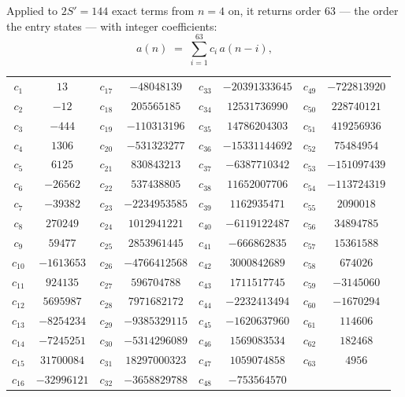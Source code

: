 \documentclass[11pt,a4paper]{article}
\theoremstyle{plain}
\theoremstyle{definition}
\begin{document}
Applied to $2S'=144$ exact terms from $n=4$ on, it returns order $63$ --- the
order the entry states --- with integer coefficients:
\[
a(n)\;=\;\sum_{i=1}^{63}c_i\,a(n-i),
\]
\begin{center}\small
\begin{tabular}{cccccccc}
$c_{1}$ & $13$ & $c_{17}$ & $-48048139$ & $c_{33}$ & $-20391333645$ & $c_{49}$ & $-722813920$ \\
$c_{2}$ & $-12$ & $c_{18}$ & $205565185$ & $c_{34}$ & $12531736990$ & $c_{50}$ & $228740121$ \\
$c_{3}$ & $-444$ & $c_{19}$ & $-110313196$ & $c_{35}$ & $14786204303$ & $c_{51}$ & $419256936$ \\
$c_{4}$ & $1306$ & $c_{20}$ & $-531323277$ & $c_{36}$ & $-15331144692$ & $c_{52}$ & $75484954$ \\
$c_{5}$ & $6125$ & $c_{21}$ & $830843213$ & $c_{37}$ & $-6387710342$ & $c_{53}$ & $-151097439$ \\
$c_{6}$ & $-26562$ & $c_{22}$ & $537438805$ & $c_{38}$ & $11652007706$ & $c_{54}$ & $-113724319$ \\
$c_{7}$ & $-39382$ & $c_{23}$ & $-2234953585$ & $c_{39}$ & $1162935471$ & $c_{55}$ & $2090018$ \\
$c_{8}$ & $270249$ & $c_{24}$ & $1012941221$ & $c_{40}$ & $-6119122487$ & $c_{56}$ & $34894785$ \\
$c_{9}$ & $59477$ & $c_{25}$ & $2853961445$ & $c_{41}$ & $-666862835$ & $c_{57}$ & $15361588$ \\
$c_{10}$ & $-1613653$ & $c_{26}$ & $-4766412568$ & $c_{42}$ & $3000842689$ & $c_{58}$ & $674026$ \\
$c_{11}$ & $924135$ & $c_{27}$ & $596704788$ & $c_{43}$ & $1711517745$ & $c_{59}$ & $-3145060$ \\
$c_{12}$ & $5695987$ & $c_{28}$ & $7971682172$ & $c_{44}$ & $-2232413494$ & $c_{60}$ & $-1670294$ \\
$c_{13}$ & $-8254234$ & $c_{29}$ & $-9385329115$ & $c_{45}$ & $-1620637960$ & $c_{61}$ & $114606$ \\
$c_{14}$ & $-7245251$ & $c_{30}$ & $-5314296089$ & $c_{46}$ & $1569083534$ & $c_{62}$ & $182468$ \\
$c_{15}$ & $31700084$ & $c_{31}$ & $18297000323$ & $c_{47}$ & $1059074858$ & $c_{63}$ & $4956$ \\
$c_{16}$ & $-32996121$ & $c_{32}$ & $-3658829788$ & $c_{48}$ & $-753564570$ &  &  \\
\end{tabular}
\end{center}
\end{document}
